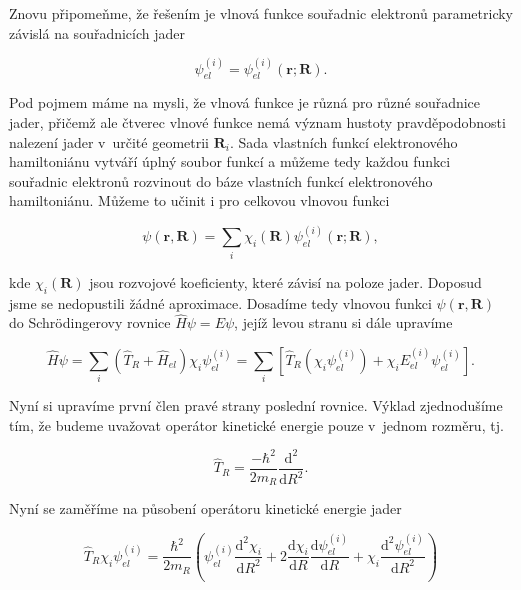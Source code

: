 \noindent Znovu připomeňme, že řešením je vlnová funkce souřadnic elektronů parametricky závislá na souřadnicích jader

\begin{equation}
\psi_{el}^{(i)}=\psi_{el}^{(i)}(\textbf{r}; \textbf{R}).
\end{equation}

\noindent Pod pojmem  máme na mysli, že vlnová funkce je různá pro různé souřadnice jader, přičemž ale čtverec vlnové funkce nemá význam hustoty pravděpodobnosti nalezení jader v~určité geometrii $\textbf{R}_i$. Sada vlastních funkcí elektronového hamiltoniánu vytváří úplný soubor funkcí a můžeme tedy každou funkci souřadnic elektronů rozvinout do báze vlastních funkcí elektronového hamiltoniánu. Můžeme to učinit i pro celkovou vlnovou funkci

\begin{equation}
\psi(\textbf{r},\textbf{R})=\sum_i \chi_i(\textbf{R})\psi_{el}^{(i)}(\textbf{r}; \textbf{R}),
\label{rov:mol-BO2}
\end{equation}

\noindent kde $\chi_i(\textbf{R})$ jsou rozvojové koeficienty, které závisí na poloze jader. Doposud jsme se nedopustili žádné aproximace. Dosadíme tedy vlnovou funkci $\psi(\textbf{r},\textbf{R})$ do Schrödingerovy rovnice $\hat{H}\psi=E\psi$, jejíž levou stranu si dále upravíme

\begin{equation}
\hat{H}\psi=\sum_i (\hat{T}_R+\hat{H}_{el})\chi_i\psi_{el}^{(i)}=\sum_i \left[\hat{T}_R(\chi_i\psi_{el}^{(i)}) + \chi_iE_{el}^{(i)}\psi_{el}^{(i)}\right].
\label{rov:mol-mat2}
\end{equation}

\noindent Nyní si upravíme první člen pravé strany poslední rovnice. Výklad zjednodušíme tím, že budeme uvažovat operátor kinetické energie pouze v~jednom rozměru, tj. 

\begin{displaymath}
\hat{T}_R=\frac{-\hbar^2}{2m_R}\frac{\mathrm{d}^2}{\mathrm{d}R^2}.
\end{displaymath}

\noindent Nyní se zaměříme na působení operátoru kinetické energie jader

\begin{equation}
\hat{T}_R\chi_i\psi_{el}^{(i)}=\frac{\hbar^2}{2m_R}\left(
\psi_{el}^{(i)}\frac{\mathrm{d}^2\chi_i}{\mathrm{d}R^2}
+2\frac{\mathrm{d}\chi_i}{\mathrm{d}R}\frac{\mathrm{d}\psi_{el}^{(i)}}{\mathrm{d}R}+\chi_i\frac{\mathrm{d}^2\psi_{el}^{(i)}}{\mathrm{d}R^2}
\right)
\label{rov:mol-BOmat}
\end{equation}

